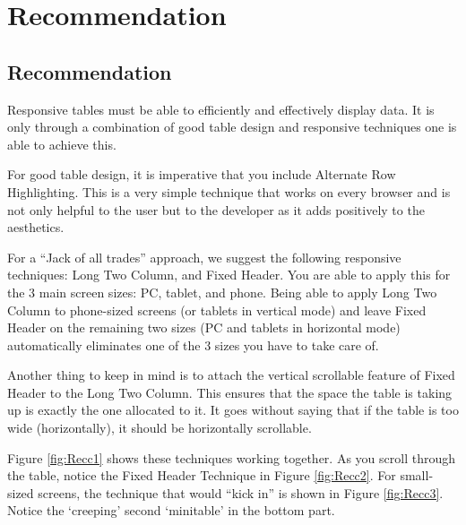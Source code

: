 %
%
%
%
%

\chapter{Recommendation}
\label{chap:Recommendation}
 


\section{Recommendation}

Responsive tables must be able to efficiently and effectively display
data. It is only through a combination of good table design and
responsive techniques one is able to achieve this. 

For good table design, it is imperative that you include Alternate Row
Highlighting. This is a very simple technique that works on every
browser and is not only helpful to the user but to the developer as it
adds positively to the aesthetics. 

For a ``Jack of all trades'' approach, we suggest the following
responsive techniques: Long Two Column, and Fixed Header. You are able
to apply this for the 3 main screen sizes: PC, tablet, and phone.
Being able to apply Long Two Column to phone-sized screens (or tablets
in vertical mode) and leave Fixed Header on the remaining two sizes
(PC and tablets in horizontal mode) automatically eliminates one of
the 3 sizes you have to take care of. 

Another thing to keep in mind is to attach the vertical scrollable
feature of Fixed Header to the Long Two Column. This ensures that the
space the table is taking up is exactly the one allocated to it. It
goes without saying that if the table is too wide (horizontally), it
should be horizontally scrollable.

Figure \ref{fig:Recc1} shows these techniques working together. As you 
scroll through the table, notice the Fixed Header Technique in Figure 
\ref{fig:Recc2}. For small-sized screens, the technique that would ``kick 
in'' is shown in Figure \ref{fig:Recc3}. Notice the `creeping' second 
`minitable' in the bottom part.

